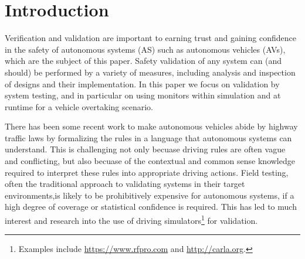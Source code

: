 \section{Introduction}

Verification and validation are important to earning trust and gaining confidence in the safety of autonomous systems (AS) such as autonomous vehicles (AVs), which are the subject of this paper. Safety validation of any system can (and should) be performed by a variety of measures, including analysis and inspection of designs and their implementation. In this paper we focus on validation by system testing, and in particular on using monitors within simulation and at runtime for a vehicle overtaking scenario. 
%

There has been some recent work to make autonomous vehicles abide by highway traffic laws by formalizing the rules in a language that autonomous systems can understand. This is challenging not only becuase driving rules are often vague and conflicting, but also becuase of the contextual and common sense knowledge required to interpret these rules into appropriate driving actions. 
%
Field testing, often the traditional approach to validating systems in their target environments,is likely to be prohibitively expensive for autonomous systems, if a high degree of coverage or statistical confidence is required. This has led to much interest and research into the use of driving simulators\footnote{Examples include \url{https://www.rfpro.com} and \url{http://carla.org}.} for validation. 
%
%

